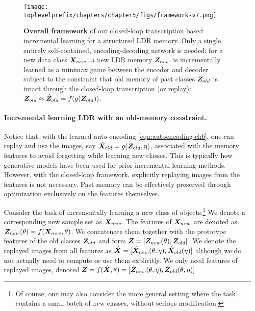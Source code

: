 \documentclass[../../book-main.tex]{subfiles}
\begin{document}
\begin{figure*}[t]
\centering
\texttt{[image: \\toplevelprefix/chapters/chapter5/figs/framework-v7.png]}
\caption{\textbf{Overall framework} of our closed-loop transcription based incremental learning for a structured LDR memory. Only a single, entirely self-contained, encoding-decoding network is needed:  for a new data class $\bm{X}_{new}$, a new LDR memory $\bm{Z}_{new}$ is incrementally learned as a minimax game between the encoder and decoder subject to the constraint that old memory of past classes $\bm{Z}_{old}$ is intact through the closed-loop transcription (or replay): $\bm{Z}_{old} \approx \hat{\bm{Z}}_{old} = f(g(\bm{Z}_{old}))$.
\vspace{-0.2in}}
\label{fig:framework}
\end{figure*}

\paragraph{Incremental learning LDR with an old-memory constraint.} 
Notice that, with the learned auto-encoding \eqref{eqn:autoencoding-ch6}, one can replay and use the images, say $\hat{\bm{X}}_{old} = g(\bm{Z}_{old}, \eta)$, associated with the memory features  to avoid forgetting while learning new classes. This is typically how generative models have been used for prior incremental learning methods. However, with the closed-loop framework, explicitly replaying images from the features is not necessary. Past memory can be effectively preserved through optimization exclusively on the features themselves.

Consider the task of incrementally learning a new class of objects.\footnote{Of course, one may also consider the more general setting where the task contains a small batch of new classes, without serious modification.} We denote a corresponding new sample set as $\bm{X}_{new}$. The features of $\bm{X}_{new}$ are denoted as  $\bm{Z}_{new}(\theta) = f(\bm{X}_{new}, \theta)$. We concatenate them together with the prototype features of the old classes $\bm{Z}_{old}$ and form $\bm{Z} = [\bm{Z}_{new}(\theta), \bm{Z}_{old}]$. We denote the replayed images from all features as $\hat{\bm{X}} = [{\hat{\bm{X}}_{new}(\theta,\eta)}, {\hat{\bm{X}}_{old}(\eta)}]$ although we do not actually need to compute or use them explicitly. We only need features of replayed images, denoted $\hat{\bm{Z}} = f(\hat{\bm{X}}, \theta) =  [{\hat{\bm{Z}}_{new}(\theta,\eta)}, {\hat{\bm{Z}}_{old}(\theta,\eta)}]$. 
\end{document}
